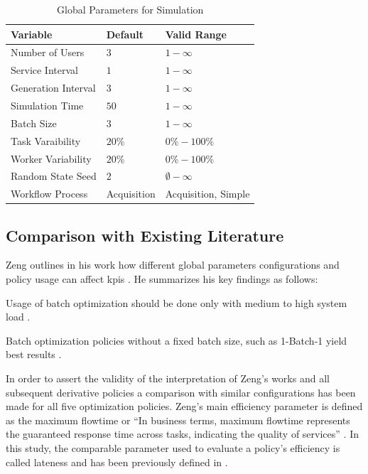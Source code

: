 \documentclass{seal_thesis}
\begin{document}
\begin{table}[!ht]
\centering
\begin{tabular}{@{}lll@{}}
\toprule
Variable            & Default     & Valid Range \\ \midrule
Number of Users     & $3$           & $1-\infty$      \\
Service Interval    & $1$           & $1-\infty$      \\
Generation Interval & $3$           & $1-\infty$      \\
Simulation Time     & $50$          & $1-\infty$      \\
Batch Size          & $3$           & $1-\infty$      \\
Task Varaibility    & $20\%$        & $0\%-100\%$      \\
Worker Variability  & $20\%$        & $0\%-100\%$      \\
Random State Seed   & $2$           & $\emptyset-\infty$      \\
Workflow Process    & Acquisition & Acquisition, Simple      \\ \bottomrule
\end{tabular}
\caption{Global Parameters for Simulation}
\label{tab:global_parameters_sim}
\end{table}

\subsection{Comparison with Existing Literature}

Zeng outlines in his work how different global parameters configurations and policy usage can affect \glspl{kpi} \cite[pp. 18-22]{Zeng2005}. He summarizes his key findings as follows:
\begin{enumerate*}
	\item Usage of batch optimization should be done only with medium to high system load \cite[p. 24]{Zeng2005}.
	\item Batch optimization policies without a fixed batch size, such as 1-Batch-1 yield best results \cite[p. 24]{Zeng2005}.
\end{enumerate*}

In order to assert the validity of the interpretation of Zeng's works and all subsequent derivative policies a comparison with similar configurations has been made for all five optimization policies. Zeng's main efficiency parameter is defined as the maximum flowtime or ``In business terms, maximum flowtime represents the guaranteed response time across tasks, indicating the quality of services'' \cite[p. 17]{Zeng2005}. In this study, the comparable parameter used to evaluate a policy's efficiency is called lateness and has been previously defined in .
\end{document}
